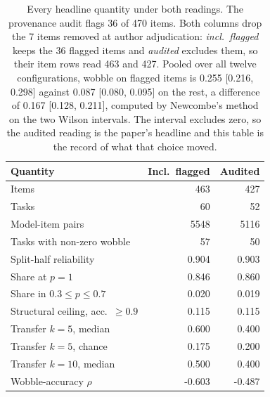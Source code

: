 \begin{table}[htbp]
\centering
\footnotesize
\setlength{\tabcolsep}{3.5pt}
\begin{tabular}{l r r}
\toprule
Quantity & Incl.\ flagged & Audited \\
\midrule
Items & 463 & 427 \\
Tasks & 60 & 52 \\
Model-item pairs & 5548 & 5116 \\
Tasks with non-zero wobble & 57 & 50 \\
Split-half reliability & 0.904 & 0.903 \\
Share at $p=1$ & 0.846 & 0.860 \\
Share in $0.3 \le p \le 0.7$ & 0.020 & 0.019 \\
Structural ceiling, acc.\ $\ge 0.9$ & 0.115 & 0.115 \\
Transfer $k=5$, median & 0.600 & 0.400 \\
Transfer $k=5$, chance & 0.175 & 0.200 \\
Transfer $k=10$, median & 0.500 & 0.400 \\
Wobble-accuracy $\rho$ & -0.603 & -0.487 \\
\bottomrule
\end{tabular}
\caption{Every headline quantity under both readings. The provenance audit flags 36 of 470 items. Both columns drop the 7 items removed at author adjudication: \emph{incl.\ flagged} keeps the 36 flagged items and \emph{audited} excludes them, so their item rows read 463 and 427. Pooled over all twelve configurations, wobble on flagged items is 0.255 [0.216, 0.298] against 0.087 [0.080, 0.095] on the rest, a difference of 0.167 [0.128, 0.211], computed by Newcombe's method on the two Wilson intervals. The interval excludes zero, so the audited reading is the paper's headline and this table is the record of what that choice moved.}
\label{tab:audit}
\end{table}
